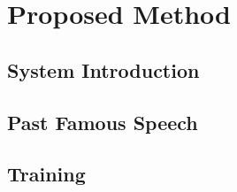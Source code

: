 \chapter{Proposed Method}


\section{System Introduction}
\section{Past Famous Speech}
\section{Training}
